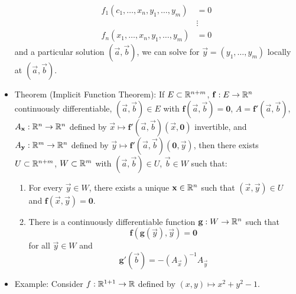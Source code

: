 \documentclass[../notes.tex]{subfiles}
\begin{document}
\begin{itemize}
    \begin{align*}
        f_1(c_1,\dots,x_n,y_1,\dots,y_m) &= 0\\
        &\vdots\\
        f_n(x_1,\dots,x_n,y_1,\dots,y_m) &= 0
    \end{align*}
    and a particular solution $(\vec{a},\vec{b})$, we can solve for $\vec{y}=(y_1,\dots,y_m)$ locally at $(\vec{a},\vec{b})$.
    \item Theorem (Implicit Function Theorem): If $E\subset\mathbb{R}^{n+m}$, $\mathbf{f}:E\to\mathbb{R}^n$ continuously differentiable, $(\vec{a},\vec{b})\in E$ with $\mathbf{f}(\vec{a},\vec{b})=\bm{0}$, $A=\mathbf{f}'(\vec{a},\vec{b})$, $A_{\mathbf{x}}:\mathbb{R}^n\to\mathbb{R}^n$ defined by $\vec{x}\mapsto\mathbf{f}'(\vec{a},\vec{b})(\vec{x},\bm{0})$ invertible, and $A_{\mathbf{y}}:\mathbb{R}^m\to\mathbb{R}^n$ defined by $\vec{y}\mapsto\mathbf{f}'(\vec{a},\vec{b})(\bm{0},\vec{y})$, then there exists $U\subset\mathbb{R}^{n+m}$, $W\subset\mathbb{R}^m$ with $(\vec{a},\vec{b})\in U$, $\vec{b}\in W$ such that:
    \begin{enumerate}
        \item For every $\vec{y}\in W$, there exists a unique $\mathbf{x}\in\mathbb{R}^n$ such that $(\vec{x},\vec{y})\in U$ and $\mathbf{f}(\vec{x},\vec{y})=\bm{0}$.
        \item There is a continuously differentiable function $\mathbf{g}:W\to\mathbb{R}^n$ such that
        \begin{equation*}
            \mathbf{f}(\mathbf{g}(\vec{y}),\vec{y}) = \bm{0}
        \end{equation*}
        for all $\vec{y}\in W$ and
        \begin{equation*}
            \mathbf{g}'(\vec{b}) = -(A_\vec{x})^{-1}A_\vec{y}
        \end{equation*}
    \end{enumerate}
    \item Example: Consider $f:\mathbb{R}^{1+1}\to\mathbb{R}$ defined by $(x,y)\mapsto x^2+y^2-1$.
\end{itemize}
\end{document}
